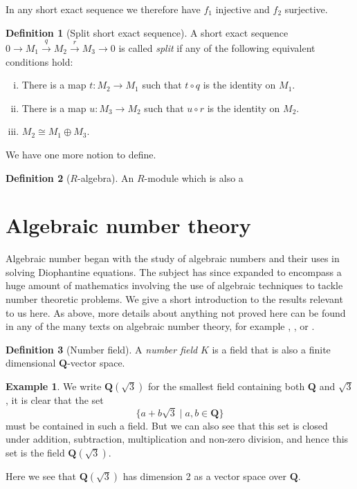 \documentclass[12pt,a4paper,abstracton,bibtotoc]{scrreprt}
\theoremstyle{definition}
\newtheorem{defn}{Definition}
\newtheorem{ex}{Example}
\newcommand{\QQ}{\mathbf{Q}}
\begin{document}
In any short exact sequence we therefore have $f_1$ injective and $f_2$ surjective.

\begin{defn}[Split short exact sequence]
A short exact sequence $0 \to M_1 \xrightarrow{q} M_2 \xrightarrow{r} M_3 \to 0$ is called \emph{split} if any of the following equivalent conditions hold:
\begin{enumerate}[(i)]
\item There is a map $t\colon M_2 \to M_1$ such that $t\circ q$ is the identity on $M_1$.
\item There is a map $u\colon M_3 \to M_2$ such that $u\circ r$ is the identity on $M_2$.
\item $M_2 \cong M_1 \oplus M_3$.
\end{enumerate}
\end{defn}

We have one more notion to define.

\begin{defn}[$R$-algebra]
An $R$-module which is also a 
\end{defn} %

\section{Algebraic number theory}
\label{sec:ant}

Algebraic number began with the study of algebraic numbers and their uses in solving Diophantine equations.
The subject has since expanded to encompass a huge amount of mathematics involving the use of algebraic techniques to tackle number theoretic problems.
We give a short introduction to the results relevant to us here.
As above, more details about anything not proved here can be found in any of the many texts on algebraic number theory, for example \cite{neukirch}, \cite{lang}, \cite{narkiewicz} or \cite{stewtall}.

\begin{defn}[Number field]
A \emph{number field} $K$ is a field that is also a finite dimensional $\QQ$-vector space.
\end{defn}

\begin{ex}\label{ex:quad}
We write $\QQ(\sqrt{3})$ for the smallest field containing both $\QQ$ and $\sqrt{3}$, it is clear that the set
\[
\{a + b\sqrt{3}\mid a,b \in \QQ\}
\]
must be contained in such a field.
But we can also see that this set is closed under addition, subtraction, multiplication and non-zero division, and hence this set is the field $\QQ(\sqrt{3})$.

Here we see that $\QQ(\sqrt{3})$ has dimension 2 as a vector space over $\QQ$.
\end{ex}
\end{document}
